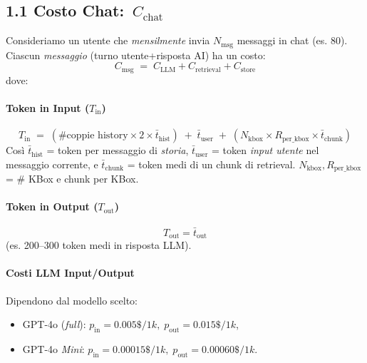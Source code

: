 \documentclass[a4paper,10pt]{article}
\begin{document}
\subsection*{1.1 Costo Chat: \(\,C_{\text{chat}}\)}

Consideriamo un utente che \emph{mensilmente} invia \(N_{\text{msg}}\) messaggi in chat (es. 80).
Ciascun \emph{messaggio} (turno utente+risposta AI) ha un costo:
\[
C_{\text{msg}}
\;=\;
C_{\text{LLM}} + C_{\text{retrieval}} + C_{\text{store}}
\]
dove:

\paragraph{Token in Input (\(T_{\text{in}}\))}
\[
T_{\text{in}}
\;=\;
(\text{\# coppie history}\times 2 \times \bar{t}_{\text{hist}})
\;+\;
\bar{t}_{\text{user}}
\;+\;
(N_{\text{kbox}}\times R_{\text{per\_kbox}}\times\bar{t}_{\text{chunk}})
\]
Così \(\bar{t}_{\text{hist}}\) = token per messaggio di \emph{storia}, \(\bar{t}_{\text{user}}\) = token \emph{input utente} nel messaggio corrente, e \(\bar{t}_{\text{chunk}}\) = token medi di un chunk di retrieval. \(N_{\text{kbox}}, R_{\text{per\_kbox}}\) = \# KBox e chunk per KBox.

\paragraph{Token in Output (\(T_{\text{out}}\))}
\[
T_{\text{out}} = \bar{t}_{\text{out}}
\]
(es. 200--300 token medi in risposta LLM).

\paragraph{Costi LLM Input/Output}
Dipendono dal modello scelto:
\begin{itemize}
    \item GPT-4o (\emph{full}): \(p_{\text{in}}=0.005\$/1k, \; p_{\text{out}}=0.015\$/1k\),
    \item GPT-4o \emph{Mini}: \(p_{\text{in}}=0.00015\$/1k, \; p_{\text{out}}=0.00060\$/1k\).
\end{itemize}
\end{document}
